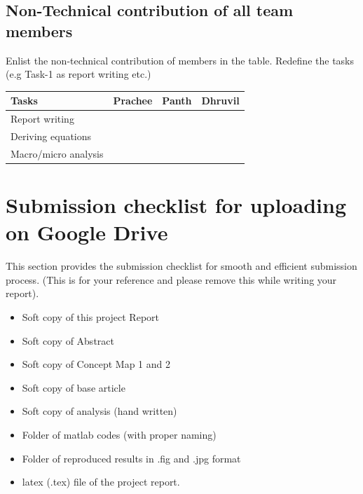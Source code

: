 \documentclass{article}
\begin{document}
\subsection{Non-Technical contribution of all team members }
Enlist the non-technical contribution of members in the table. Redefine the tasks (e.g Task-1 as report writing etc.)
\begin{table}[h]
\centering
\begin{tabular}{|l|l|l|l|}
\hline
Tasks  & Prachee       & Panth         & Dhruvil \\ \hline
Report writing &               &               &               \\ \hline
Deriving equations &               &               &    \\ \hline
Macro/micro analysis&               &               &               \\ \hline
\end{tabular}
\end{table}


\section{Submission checklist for uploading on Google Drive}
This section provides the submission checklist for smooth and efficient submission process.  (This is for your reference and please remove this while writing your report).
\begin{itemize}

\item Soft copy of this project Report
\item Soft copy of Abstract
\item Soft copy of Concept Map 1 and 2
\item Soft copy of base article
\item Soft copy of analysis (hand written)
\item Folder of matlab codes (with proper naming)
\item Folder of reproduced results in .fig and .jpg format
\item latex (.tex) file of the project report.
\end{itemize}



\end{document}

